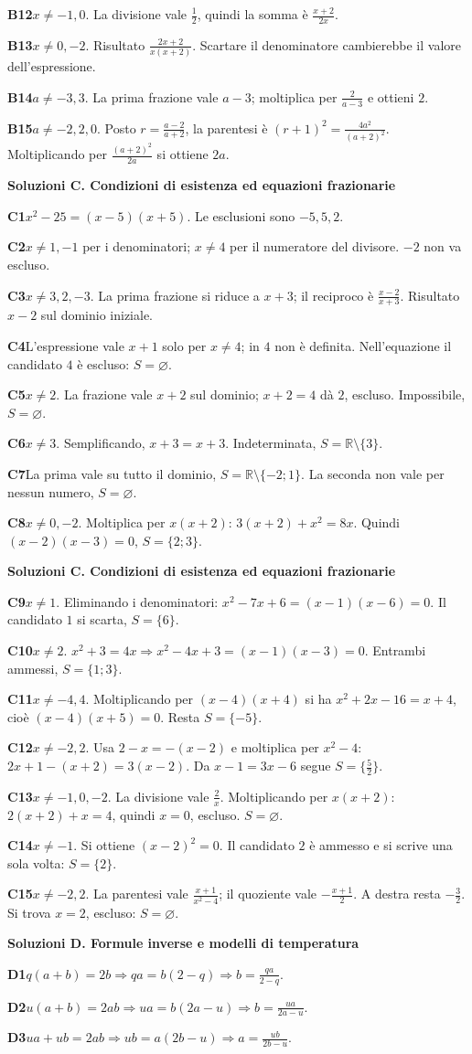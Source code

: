 \documentclass[11pt,a4paper]{article}
\newcommand{\R}{\mathbb R}
\newcommand{\tit}[1]{\par{\Large\bfseries\color{blu}#1}\par\smallskip}
\newcommand{\sott}[1]{\par\medskip{\large\bfseries\color{blu}#1}\par\smallskip}
\newcommand{\sol}[2]{\Needspace{3\baselineskip}\par\medskip\textbf{\color{verde}#1}\quad #2\par}
\begin{document}
\sol{B12}{$x\ne-1,0$. La divisione vale $\frac12$, quindi la somma è $\frac{x+2}{2x}$.}
\sol{B13}{$x\ne0,-2$. Risultato $\frac{2x+2}{x(x+2)}$. Scartare il denominatore cambierebbe il valore dell’espressione.}
\sol{B14}{$a\ne-3,3$. La prima frazione vale $a-3$; moltiplica per $\frac2{a-3}$ e ottieni $2$.}
\sol{B15}{$a\ne-2,2,0$. Posto $r=\frac{a-2}{a+2}$, la parentesi è $(r+1)^2=\frac{4a^2}{(a+2)^2}$. Moltiplicando per $\frac{(a+2)^2}{2a}$ si ottiene $2a$.}
\clearpage
\tit{Soluzioni C. Condizioni di esistenza ed equazioni frazionarie}
\sott{C1--C8}
\sol{C1}{$x^2-25=(x-5)(x+5)$. Le esclusioni sono $-5,5,2$.}
\sol{C2}{$x\ne1,-1$ per i denominatori; $x\ne4$ per il numeratore del divisore. $-2$ non va escluso.}
\sol{C3}{$x\ne3,2,-3$. La prima frazione si riduce a $x+3$; il reciproco è $\frac{x-2}{x+3}$. Risultato $x-2$ sul dominio iniziale.}
\sol{C4}{L’espressione vale $x+1$ solo per $x\ne4$; in $4$ non è definita. Nell’equazione il candidato $4$ è escluso: $S=\varnothing$.}
\sol{C5}{$x\ne2$. La frazione vale $x+2$ sul dominio; $x+2=4$ dà $2$, escluso. Impossibile, $S=\varnothing$.}
\sol{C6}{$x\ne3$. Semplificando, $x+3=x+3$. Indeterminata, $S=\R\setminus\{3\}$.}
\sol{C7}{La prima vale su tutto il dominio, $S=\R\setminus\{-2;1\}$. La seconda non vale per nessun numero, $S=\varnothing$.}
\sol{C8}{$x\ne0,-2$. Moltiplica per $x(x+2)$: $3(x+2)+x^2=8x$. Quindi $(x-2)(x-3)=0$, $S=\{2;3\}$.}
\clearpage
\tit{Soluzioni C. Condizioni di esistenza ed equazioni frazionarie}
\sott{C9--C15}
\sol{C9}{$x\ne1$. Eliminando i denominatori: $x^2-7x+6=(x-1)(x-6)=0$. Il candidato $1$ si scarta, $S=\{6\}$.}
\sol{C10}{$x\ne2$. $x^2+3=4x\Rightarrow x^2-4x+3=(x-1)(x-3)=0$. Entrambi ammessi, $S=\{1;3\}$.}
\sol{C11}{$x\ne-4,4$. Moltiplicando per $(x-4)(x+4)$ si ha $x^2+2x-16=x+4$, cioè $(x-4)(x+5)=0$. Resta $S=\{-5\}$.}
\sol{C12}{$x\ne-2,2$. Usa $2-x=-(x-2)$ e moltiplica per $x^2-4$: $2x+1-(x+2)=3(x-2)$. Da $x-1=3x-6$ segue $S=\{\frac52\}$.}
\sol{C13}{$x\ne-1,0,-2$. La divisione vale $\frac2x$. Moltiplicando per $x(x+2)$: $2(x+2)+x=4$, quindi $x=0$, escluso. $S=\varnothing$.}
\sol{C14}{$x\ne-1$. Si ottiene $(x-2)^2=0$. Il candidato $2$ è ammesso e si scrive una sola volta: $S=\{2\}$.}
\sol{C15}{$x\ne-2,2$. La parentesi vale $\frac{x+1}{x^2-4}$; il quoziente vale $-\frac{x+1}{2}$. A destra resta $-\frac32$. Si trova $x=2$, escluso: $S=\varnothing$.}
\clearpage
\tit{Soluzioni D. Formule inverse e modelli di temperatura}
\sott{D1--D8}
\sol{D1}{$q(a+b)=2b\Rightarrow qa=b(2-q)\Rightarrow b=\frac{qa}{2-q}$.}
\sol{D2}{$u(a+b)=2ab\Rightarrow ua=b(2a-u)\Rightarrow b=\frac{ua}{2a-u}$.}
\sol{D3}{$ua+ub=2ab\Rightarrow ub=a(2b-u)\Rightarrow a=\frac{ub}{2b-u}$.}
\end{document}
